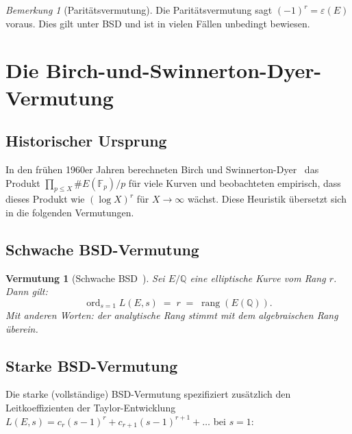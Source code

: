 \documentclass[12pt,a4paper]{article}
\newtheorem{conjecture}[theorem]{Vermutung}
\theoremstyle{remark}
\newtheorem{remark}[theorem]{Bemerkung}
\begin{document}
\begin{remark}[Paritätsvermutung]
  Die Paritätsvermutung sagt $(-1)^r = \varepsilon(E)$ voraus. Dies gilt unter BSD und
  ist in vielen Fällen unbedingt bewiesen.
\end{remark}

\section{Die Birch-und-Swinnerton-Dyer-Vermutung}

\subsection{Historischer Ursprung}

In den frühen 1960er Jahren berechneten Birch und Swinnerton-Dyer~\cite{BSD1965} das
Produkt $\prod_{p \leq X} \#E(\mathbb{F}_p)/p$ für viele Kurven und beobachteten empirisch,
dass dieses Produkt wie $(\log X)^r$ für $X \to \infty$ wächst. Diese Heuristik übersetzt
sich in die folgenden Vermutungen.

\subsection{Schwache BSD-Vermutung}

\begin{conjecture}[Schwache BSD~\cite{BSD1965,BSD1963}]
  Sei $E/\mathbb{Q}$ eine elliptische Kurve vom Rang $r$. Dann gilt:
  \begin{equation}\label{eq:weakbsd}
    \operatorname{ord}_{s=1} L(E,s) \;=\; r \;=\; \operatorname{rang}(E(\mathbb{Q})).
  \end{equation}
  Mit anderen Worten: der analytische Rang stimmt mit dem algebraischen Rang überein.
\end{conjecture}

\subsection{Starke BSD-Vermutung}

Die starke (vollständige) BSD-Vermutung spezifiziert zusätzlich den Leitkoeffizienten
der Taylor-Entwicklung $L(E,s) = c_r (s-1)^r + c_{r+1}(s-1)^{r+1} + \ldots$ bei $s=1$:
\end{document}

